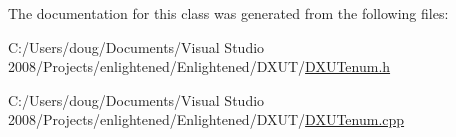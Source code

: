 The documentation for this class was generated from the following files:\begin{DoxyCompactItemize}
\item 
C:/Users/doug/Documents/Visual Studio 2008/Projects/enlightened/Enlightened/DXUT/\hyperlink{_d_x_u_tenum_8h}{DXUTenum.h}\item 
C:/Users/doug/Documents/Visual Studio 2008/Projects/enlightened/Enlightened/DXUT/\hyperlink{_d_x_u_tenum_8cpp}{DXUTenum.cpp}\end{DoxyCompactItemize}
